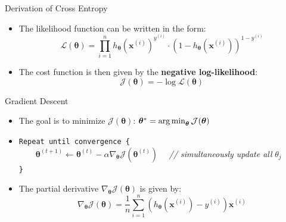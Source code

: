 \begin{frame}{Derivation of Cross Entropy}{}\optional
	\begin{itemize}
		\item The likelihood function can be written in the form:
		\begin{equation}
			\mathcal{L}(\bm{\theta}) = \prod_{i=1}^n h_{\bm{\theta}}(\bm{x}^{(i)})^{y^{(i)}} \cdot (1 - h_{\bm{\theta}}(\bm{x}^{(i)}))^{1 - y^{(i)}}
		\end{equation}
		\item The cost function is then given by the \textbf{negative log-likelihood}:
		\begin{equation}
			\mathcal{J}(\bm{\theta}) = -\log \mathcal{L}(\bm{\theta})
		\end{equation}
	\end{itemize}
\end{frame}


\begin{frame}{Gradient Descent}{}
	\begin{itemize}
		\item The goal is to minimize $\mathcal{J}(\bm{\theta})$: $\bm{\theta}^*
			= \operatorname*{arg\,min}_{\bm{\theta}} \mathcal{J}(\bm{\theta})$
		\item \texttt{Repeat until convergence \{} \\
			$\qquad \bm{\theta}^{(t+1)} \longleftarrow \bm{\theta}^{(t)} - \alpha \nabla_{\bm{\theta}}
				\mathcal{J}(\bm{\theta}^{(t)}) \quad$
			\textcolor{myblue1}{\textit{// simultaneously update all} $\theta_j$} \\
		\texttt{\}}
		\item The partial derivative $\nabla_{\bm{\theta}} \mathcal{J}(\bm{\theta})$ is given by:
		{\footnotesize
		\begin{equation}
			\nabla_{\bm{\theta}} \mathcal{J}(\bm{\theta}) = \frac{1}{n} \sum_{i=1}^n \left(
				h_{\bm{\theta}}(\bm{x}^{(i)}) - y^{(i)}
			\right) \bm{x}^{(i)}
		\end{equation}}
	\end{itemize}
	\vspace*{-3mm}
	\begin{boxBlueNoFrame}
	\end{boxBlueNoFrame}
\end{frame}


